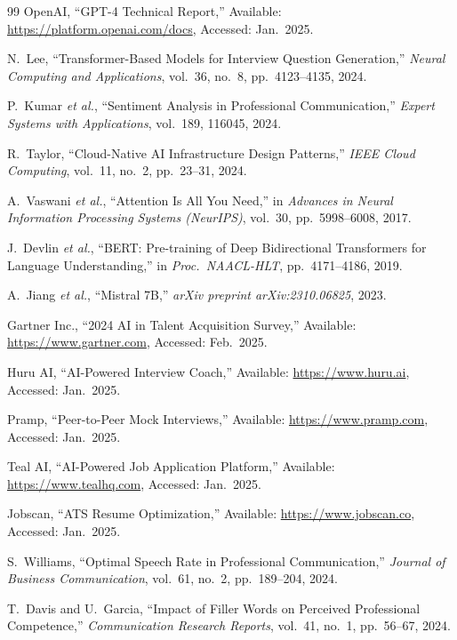 \documentclass[12pt,a4paper,oneside]{report}
\begin{document}
\begin{thebibliography}{99}
OpenAI, ``GPT-4 Technical Report,'' Available: \url{https://platform.openai.com/docs}, Accessed: Jan.\ 2025.

N.~Lee, ``Transformer-Based Models for Interview Question Generation,'' \textit{Neural Computing and Applications}, vol.~36, no.~8, pp.~4123--4135, 2024.

P.~Kumar \textit{et al.}, ``Sentiment Analysis in Professional Communication,'' \textit{Expert Systems with Applications}, vol.~189, 116045, 2024.

R.~Taylor, ``Cloud-Native AI Infrastructure Design Patterns,'' \textit{IEEE Cloud Computing}, vol.~11, no.~2, pp.~23--31, 2024.

A.~Vaswani \textit{et al.}, ``Attention Is All You Need,'' in \textit{Advances in Neural Information Processing Systems (NeurIPS)}, vol.~30, pp.~5998--6008, 2017.

J.~Devlin \textit{et al.}, ``BERT: Pre-training of Deep Bidirectional Transformers for Language Understanding,'' in \textit{Proc.\ NAACL-HLT}, pp.~4171--4186, 2019.

A.~Jiang \textit{et al.}, ``Mistral 7B,'' \textit{arXiv preprint arXiv:2310.06825}, 2023.

Gartner Inc., ``2024 AI in Talent Acquisition Survey,'' Available: \url{https://www.gartner.com}, Accessed: Feb.\ 2025.

Huru AI, ``AI-Powered Interview Coach,'' Available: \url{https://www.huru.ai}, Accessed: Jan.\ 2025.

Pramp, ``Peer-to-Peer Mock Interviews,'' Available: \url{https://www.pramp.com}, Accessed: Jan.\ 2025.

Teal AI, ``AI-Powered Job Application Platform,'' Available: \url{https://www.tealhq.com}, Accessed: Jan.\ 2025.

Jobscan, ``ATS Resume Optimization,'' Available: \url{https://www.jobscan.co}, Accessed: Jan.\ 2025.

S.~Williams, ``Optimal Speech Rate in Professional Communication,'' \textit{Journal of Business Communication}, vol.~61, no.~2, pp.~189--204, 2024.

T.~Davis and U.~Garcia, ``Impact of Filler Words on Perceived Professional Competence,'' \textit{Communication Research Reports}, vol.~41, no.~1, pp.~56--67, 2024.

\end{thebibliography}
\end{document}
